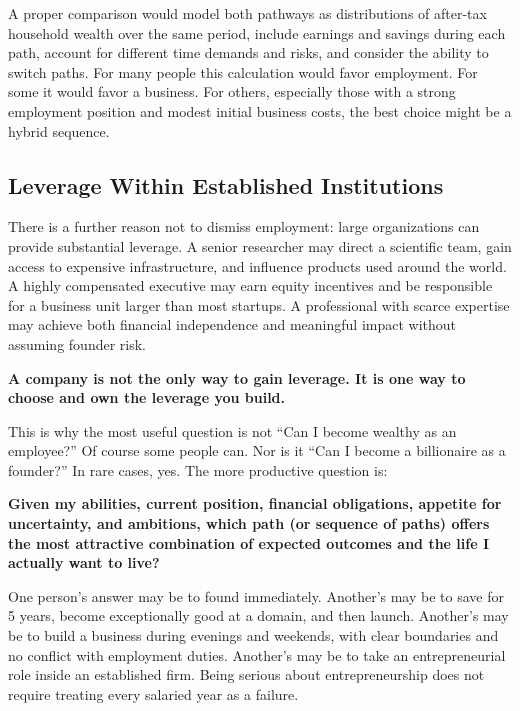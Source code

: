 A proper comparison would model both pathways as distributions of after-tax household wealth over the same period, include earnings and savings during each path, account for different time demands and risks, and consider the ability to switch paths. For many people this calculation would favor employment. For some it would favor a business. For others, especially those with a strong employment position and modest initial business costs, the best choice might be a hybrid sequence.

\subsection{Leverage Within Established Institutions}

There is a further reason not to dismiss employment: large organizations can provide substantial leverage. A senior researcher may direct a scientific team, gain access to expensive infrastructure, and influence products used around the world. A highly compensated executive may earn equity incentives and be responsible for a business unit larger than most startups. A professional with scarce expertise may achieve both financial independence and meaningful impact without assuming founder risk.

\textbf{A company is not the only way to gain leverage. It is one way to choose and own the leverage you build.}

This is why the most useful question is not ``Can I become wealthy as an employee?'' Of course some people can. Nor is it ``Can I become a billionaire as a founder?'' In rare cases, yes. The more productive question is:

\textbf{Given my abilities, current position, financial obligations, appetite for uncertainty, and ambitions, which path (or sequence of paths) offers the most attractive combination of expected outcomes and the life I actually want to live?}

One person's answer may be to found immediately. Another's may be to save for 5 years, become exceptionally good at a domain, and then launch. Another's may be to build a business during evenings and weekends, with clear boundaries and no conflict with employment duties. Another's may be to take an entrepreneurial role inside an established firm. Being serious about entrepreneurship does not require treating every salaried year as a failure.
